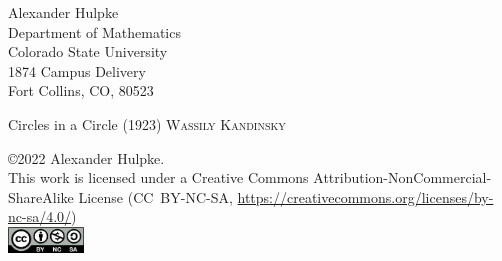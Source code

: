\documentclass[10pt]{memoir}
\theoremstyle{mybem}
\begin{document}
\newpage
\thispagestyle{empty}
\begin{raggedright}
{\small
Alexander Hulpke\\
Department of Mathematics\\
Colorado State University\\
1874 Campus Delivery\\
Fort Collins, CO, 80523
}
\end{raggedright}
\vfill
\setlength\epigraphwidth{4cm}
\begin{epigraphs}
{Circles in a Circle (1923)}
\textsc{Wassily Kandinsky}
\end{epigraphs}
\vspace{1cm}
\begin{raggedright}
{\small
\bigskip

\copyright 2022 Alexander Hulpke.\\
This work is licensed under a 
Creative Commons Attribution-NonCommercial-ShareAlike License (CC~BY-NC-SA,
{\footnotesize \url{https://creativecommons.org/licenses/by-nc-sa/4.0/}})\\
\includegraphics[width=2cm]{pic/by-nc-sa.png}
}
\end{raggedright}
\newpage
\setlength{\cftchapternumwidth}{2em}
\setlength{\cftsectionnumwidth}{2.5em}
\setlength{\cftsubsectionindent}{4em}
\tableofcontents

\mainmatter








%
\printindex
\end{document}
